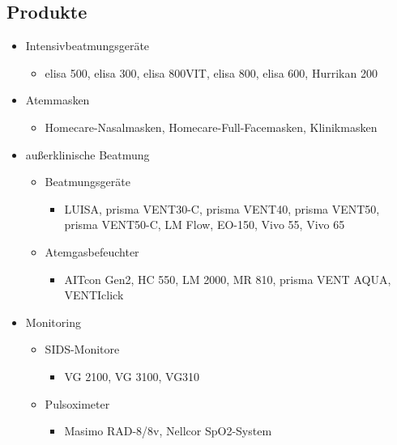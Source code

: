 \documentclass[a4paper, 12pt]{article}
\begin{document}
\subsection{Produkte}\label{products}

\begin{itemize}[noitemsep, topsep=0pt]
    \item Intensivbeatmungsgeräte
    \begin{itemize}[noitemsep, topsep=0pt]
        \item elisa 500, elisa 300, elisa 800VIT, elisa 800, elisa 600, Hurrikan 200
    \end{itemize}

    \item Atemmasken
    \begin{itemize}[noitemsep, topsep=0pt]
        \item Homecare-Nasalmasken, Homecare-Full-Facemasken, Klinikmasken
    \end{itemize}

    \item außerklinische Beatmung
    \begin{itemize}[noitemsep, topsep=0pt]
        \item Beatmungsgeräte
        \begin{itemize}[noitemsep, topsep=0pt]
            \item LUISA, prisma VENT30-C, prisma VENT40, prisma VENT50, prisma VENT50-C, LM Flow, EO-150, Vivo 55, Vivo 65
        \end{itemize}
        \item Atemgasbefeuchter
        \begin{itemize}[noitemsep, topsep=0pt]
            \item AITcon Gen2, HC 550, LM 2000, MR 810, prisma VENT AQUA, VENTIclick
        \end{itemize}
    \end{itemize}

    \item Monitoring
    \begin{itemize}[noitemsep, topsep=0pt]
        \item SIDS-Monitore
        \begin{itemize}[noitemsep, topsep=0pt]
            \item VG 2100, VG 3100, VG310
        \end{itemize}
        \item Pulsoximeter
        \begin{itemize}[noitemsep, topsep=0pt]
            \item Masimo RAD-8/8v, Nellcor SpO2-System
        \end{itemize}
    \end{itemize}


\end{itemize}
\end{document}
